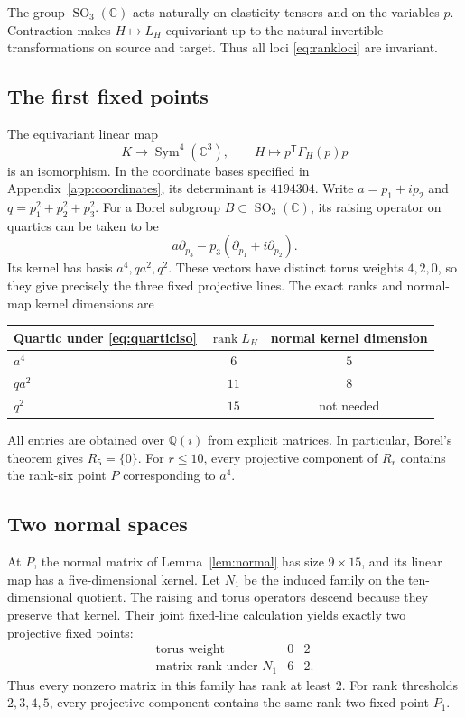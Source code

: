 \documentclass[11pt]{amsart}
\theoremstyle{remark}
\newcommand{\C}{\mathbb C}
\newcommand{\Q}{\mathbb Q}
\newcommand{\rank}{\operatorname{rank}}
\newcommand{\Sym}{\operatorname{Sym}}
\newcommand{\SO}{\operatorname{SO}}
\begin{document}
The group $\SO_3(\C)$ acts naturally on elasticity tensors and on the variables $p$. Contraction makes $H\mapsto L_H$ equivariant up to the natural invertible transformations on source and target. Thus all loci \eqref{eq:rankloci} are invariant.

\subsection{The first fixed points}
The equivariant linear map
\begin{equation}\label{eq:quarticiso}
 K\longrightarrow\Sym^4(\C^3),\qquad H\longmapsto p^{\mathsf T}\Gamma_H(p)p
\end{equation}
is an isomorphism. In the coordinate bases specified in Appendix~\ref{app:coordinates}, its determinant is $4194304$. Write $a=p_1+ip_2$ and $q=p_1^2+p_2^2+p_3^2$. For a Borel subgroup $B\subset\SO_3(\C)$, its raising operator on quartics can be taken to be
\[
 a\partial_{p_3}-p_3(\partial_{p_1}+i\partial_{p_2}).
\]
Its kernel has basis $a^4,qa^2,q^2$. These vectors have distinct torus weights $4,2,0$, so they give precisely the three fixed projective lines. The exact ranks and normal-map kernel dimensions are
\begin{center}
\begin{tabular}{lcc}
\toprule
Quartic under \eqref{eq:quarticiso} & $\rank L_H$ & normal kernel dimension\\
\midrule
$a^4$ & $6$ & $5$\\
$qa^2$ & $11$ & $8$\\
$q^2$ & $15$ & not needed\\
\bottomrule
\end{tabular}
\end{center}
All entries are obtained over $\Q(i)$ from explicit matrices. In particular, Borel's theorem gives $R_5=\{0\}$. For $r\leq10$, every projective component of $R_r$ contains the rank-six point $P$ corresponding to $a^4$.

\subsection{Two normal spaces}
At $P$, the normal matrix of Lemma~\ref{lem:normal} has size $9\times15$, and its linear map has a five-dimensional kernel. Let $N_1$ be the induced family on the ten-dimensional quotient. The raising and torus operators descend because they preserve that kernel. Their joint fixed-line calculation yields exactly two projective fixed points:
\[
 \begin{array}{c|cc}
 \text{torus weight}&0&2\\ \hline
 \text{matrix rank under }N_1&6&2.
 \end{array}
\]
Thus every nonzero matrix in this family has rank at least $2$. For rank thresholds $2,3,4,5$, every projective component contains the same rank-two fixed point $P_1$.
\end{document}
